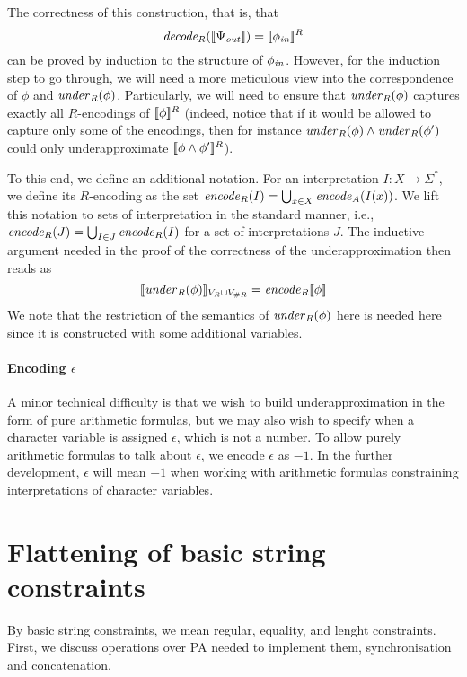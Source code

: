 \documentclass[sigplan,review,anonymous]{acmart}\settopmatter{printfolios=true,printccs=false,printacmref=false}
\begin{document}
The correctness of this construction, that is, that 
$$\mathit{decode_{R}} ([\![\Psi_{\mathit{out}}]\!]) = [\![\phi_{\mathit{in}}]\!]^R$$ can be proved by induction to the structure of $\phi_{\mathit{in}}$. However, for the induction step to go through, we will need a more meticulous view into the correspondence of $\phi$ and $\mathit{under}_R(\phi)$. Particularly, we will need to
 ensure that $\mathit{under}_R(\phi)$ captures exactly all $R$-encodings of $[\![\phi]\!]^R$
(indeed, notice that if it would be allowed to capture only some of the encodings, then for instance $\mathit{under}_R(\phi) \land \mathit{under}_R(\phi')$ could only underapproximate $[\![\phi\land\phi']\!]^R$).

To this end, we define an additional notation.
For an interpretation $I:X\rightarrow \Sigma^*$, we define its $R$-encoding as the set $\mathit{encode}_{R}(I) = \bigcup_{x\in X} \mathit{encode}_{A}(I(x))$. We lift this notation to sets of interpretation in the standard manner, i.e., $\mathit{encode}_{R} (J) = \bigcup_{I \in J}\mathit{encode}_{R} (I)$ for a set of interpretations $J$.
%
The inductive argument needed in the proof of the correctness of the underapproximation then reads as
$$[\![\mathit{under}_R(\phi)]\!]_{V_R\cup V_{\#R}} = \mathit{encode}_{R}{[\![\phi]\!]}$$ 
We note that the restriction of the semantics of $\mathit{under}_R(\phi)$ here is needed here since it is constructed with some additional variables. 


\paragraph{Encoding $\epsilon$}
A minor technical difficulty is that we wish to build underapproximation in the form of pure arithmetic formulas, 
but we may also wish to specify when a character variable is assigned $\epsilon$, which is not a number. 
To allow purely arithmetic formulas to talk about $\epsilon$, we encode $\epsilon$ as $-1$.
In the further development, $\epsilon$ will mean $-1$ when working with arithmetic formulas constraining interpretations of character variables. 

\section{Flattening of basic string constraints}
By basic string constraints, we mean regular, equality, and lenght constraints.
First, we discuss operations over PA needed to implement them, synchronisation and concatenation.
\end{document}
